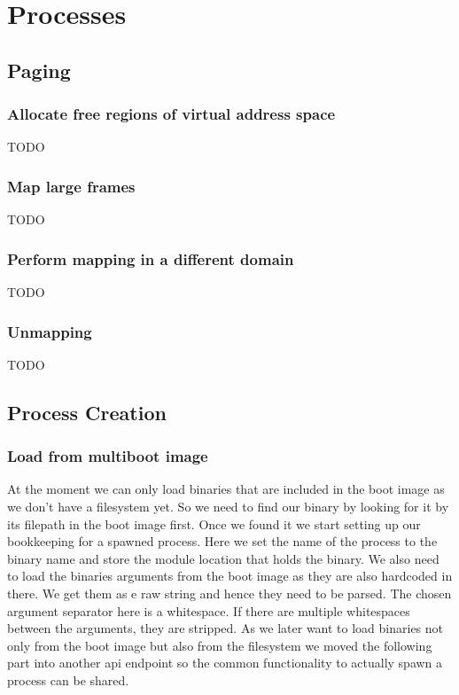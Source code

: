 \chapter{Processes}

\section{Paging}

\subsection{Allocate free regions of virtual address space}
TODO

\subsection{Map large frames}
TODO

\subsection{Perform mapping in a different domain}
TODO

\subsection{Unmapping}
TODO

\section{Process Creation}

\subsection{Load from multiboot image}

At the moment we can only load binaries that are included in the boot image as
we don't have a filesystem yet. So we need to find our binary by looking for it
by its filepath in the boot image first.  Once we found it we start setting up
our bookkeeping for a spawned process. Here we set the name of the process to
the binary name and store the module location that holds the binary.  We also
need to load the binaries arguments from the boot image as they are also
hardcoded in there. We get them as e raw string and hence they need to be
parsed. The chosen argument separator here is a whitespace. If there are
multiple whitespaces between the arguments, they are stripped.  As we later want
to load binaries not only from the boot image but also from the filesystem we
moved the following part into another api endpoint so the common functionality
to actually spawn a process can be shared.

